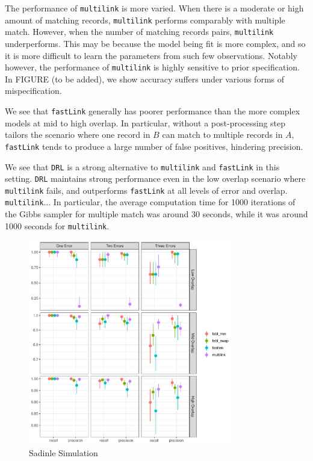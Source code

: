 \documentclass[12pt,letterpaper]{article}
\newcommand{\1}[1]{\mathbb{I}\!\left[#1\right]} %
\begin{document}
The performance of \texttt{multilink} is more varied. When there is a moderate or high amount of matching records, \texttt{multilink} performs comparably with multiple match. However, when the number of matching records pairs, \texttt{multilink} underperforms. This may be because the model being fit is more complex, and so it is more difficult to learn the parameters from such few observations. Notably however, the performance of \texttt{multilink} is highly sensitive to prior specification. In FIGURE (to be added), we show accuracy suffers under various forms of mispecification.

We see that \texttt{fastLink} generally has poorer performance than the more complex models at mid to high overlap. In particular, without a post-processing step tailors the scenario where one record in $B$ can match to multiple records in $A$, \texttt{fastLink} tends to produce a large number of false positives, hindering precision. 


We see that \texttt{DRL} is a strong alternative to \texttt{multilink} and \texttt{fastLink} in this setting. \texttt{DRL} maintains strong performance even in the low overlap scenario where \texttt{multilink} fails, and outperforms \texttt{fastLink} at all levels of error and overlap. \texttt{multilink}... In particular, the average computation time for 1000 iterations of the Gibbs sampler for multiple match was around 30 seconds, while it was around 1000 seconds for \texttt{multilink}. 

\begin{figure}[t]
	\centering
	\includegraphics[width=0.8\textwidth]{../Rplots.pdf}
	\caption{Sadinle Simulation}
	\label{fig:sadinle}
\end{figure}
\end{document}
